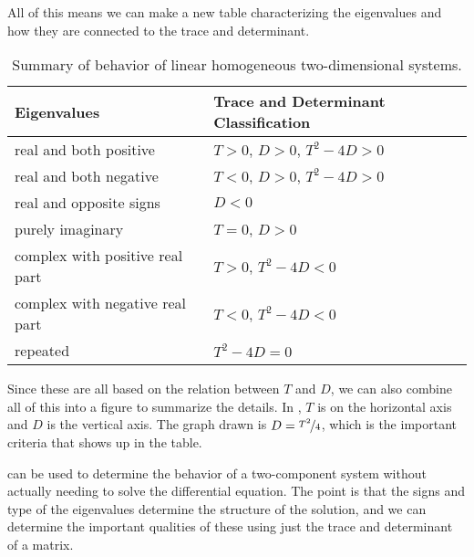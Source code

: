 \documentclass{ximera}
\begin{document}
All of this means we can make a new table characterizing the eigenvalues and how they are connected to the trace and determinant. 

\begin{table}[h!t]
    \mybeginframe
    \capstart
    \begin{center}
        \begin{tabular}{@{}ll@{}}
            \toprule
            Eigenvalues & Trace and Determinant Classification \\
            \midrule
            real and both positive & $T > 0$, $D > 0$, $T^2 - 4D > 0$  \\
            real and both negative &  $T < 0$, $D > 0$, $T^2 - 4D > 0$\\
            real and opposite signs & $D < 0$ \\
            purely imaginary &  $T = 0$, $D > 0$\\
            complex with positive real part & $T > 0$, $T^2 - 4D < 0$  \\
            complex with negative real part &  $T < 0$, $T^2 - 4D < 0$ \\
            repeated & $T^2 - 4D = 0$ \\
            \bottomrule
        \end{tabular}
    \end{center}
    \caption{Summary of behavior of linear homogeneous two-dimensional systems.\label{pln:behtabTD}}
    \myendframe
\end{table}

Since these are all based on the relation between $T$ and $D$, we can also combine all of this into a figure to summarize the details. In , $T$ is on the horizontal axis and $D$ is the vertical axis. The graph drawn is $D = \nicefrac{T^2}{4}$, which is the important criteria that shows up in the table. 

\begin{myfig}
    \capstart
    \caption{Trace-Determinant plane for analysis of two-component linear systems. \label{fig:TDPlaneAnalysis}}
\end{myfig}

 can be used to determine the behavior of a two-component system without actually needing to solve the differential equation. The point is that the signs and type of the eigenvalues determine the structure of the solution, and we can determine the important qualities of these using just the trace and determinant of a matrix.
\end{document}
